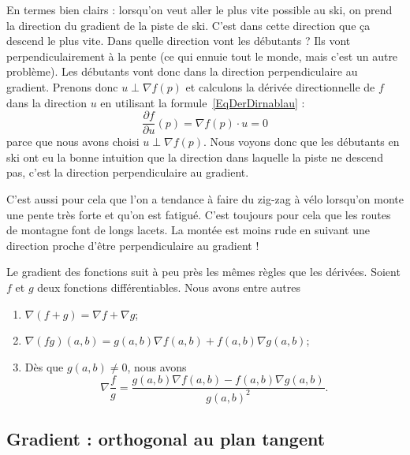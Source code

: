 En termes bien clairs : lorsqu'on veut aller le plus vite possible au ski, on prend la direction du gradient de la piste de ski. C'est dans cette direction que ça descend le plus vite. Dans quelle direction vont les débutants ? Ils vont perpendiculairement à la pente (ce qui ennuie tout le monde, mais c'est un autre problème). Les débutants vont donc dans la direction perpendiculaire au gradient. Prenons donc \( u\perp \nabla f(p)\) et calculons la dérivée directionnelle de \( f\) dans la direction \( u\) en utilisant la formule~\ref{EqDerDirnablau} :
\begin{equation}
	\frac{ \partial f }{ \partial u }(p)=\nabla f(p)\cdot u=0
\end{equation}
parce que nous avons choisi \( u\perp \nabla f(p)\). Nous voyons donc que les débutants en ski ont eu la bonne intuition que la direction dans laquelle la piste ne descend pas, c'est la direction perpendiculaire au gradient.

C'est aussi pour cela que l'on a tendance à faire du zig-zag à vélo lorsqu'on monte une pente très forte et qu'on est fatigué. C'est toujours pour cela que les routes de montagne font de longs lacets. La montée est moins rude en suivant une direction proche d'être perpendiculaire au gradient !

\begin{theorem}
	Le gradient des fonctions suit à peu près les mêmes règles que les dérivées. Soient \( f\) et \( g\) deux fonctions différentiables. Nous avons entre autres
	\begin{enumerate}
		\item
		      \( \nabla(f+g)=\nabla f+\nabla g\);
		\item
		      \( \nabla(fg)(a,b)=g(a,b)\nabla f(a,b)+f(a,b)\nabla g(a,b)\);
		\item
		      Dès que \( g(a,b)\neq 0\), nous avons
		      \begin{equation}
			      \nabla\frac{ f }{ g }=\frac{ g(a,b)\nabla f(a,b)-f(a,b)\nabla g(a,b) }{ g(a,b)^2 }.
		      \end{equation}
	\end{enumerate}
\end{theorem}

\subsection{Gradient : orthogonal au plan tangent}

